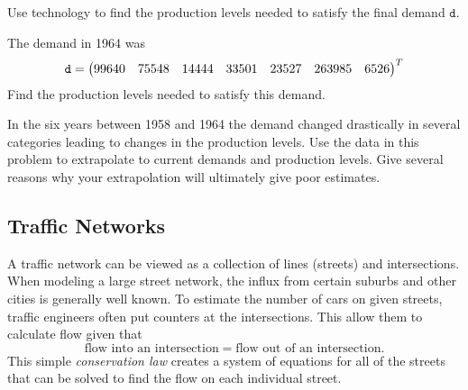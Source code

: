 \begin{lab}
    \ba
        \item Use technology to find the production levels needed to satisfy the final
            demand $\texttt{d}$.
        \item The demand in 1964 was 
            \[ \texttt{d} = \begin{pmatrix} 99640&75548&14444&33501&23527&263985&6526 \end{pmatrix}^T \]
            Find the production levels needed to satisfy this demand.
        \item In the six years between 1958 and 1964 the demand changed drastically in
            several categories leading to changes in the production levels.  Use the data
            in this problem to extrapolate to current demands and production levels.  Give
            several reasons why your extrapolation will ultimately give poor estimates.
    \ea
\end{lab}

\subsection{Traffic Networks}
A traffic network can be viewed as a collection of lines (streets) and intersections.
When modeling a large street network, the influx from certain suburbs and other cities is
generally well known.  To estimate the number of cars on given streets, traffic engineers
often put counters at the intersections.  This allow them to calculate flow given that
\[ \text{flow into an intersection} = \text{flow out of an intersection}. \]
This simple {\it conservation law} creates a system of equations for all of the streets
that can be solved to find the flow on each individual street.

